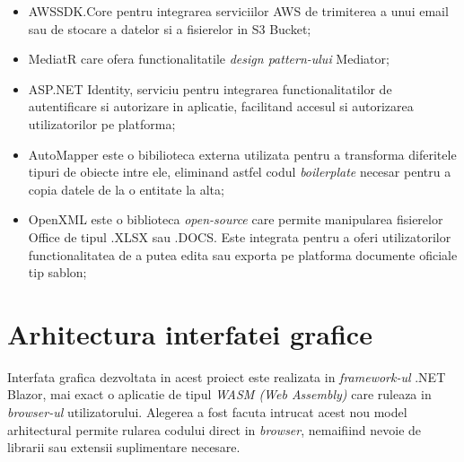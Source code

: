 \begin{itemize}
	\item  AWSSDK.Core pentru integrarea serviciilor AWS de trimiterea a unui email sau de stocare a datelor si a fisierelor in S3 Bucket;
	
	\item  MediatR care ofera functionalitatile \textit{design pattern-ului} Mediator;
	
	\item ASP.NET Identity, serviciu pentru integrarea functionalitatilor de autentificare si autorizare in aplicatie, facilitand accesul si autorizarea utilizatorilor pe platforma;
	
	
	\item AutoMapper este o bibilioteca externa utilizata pentru a transforma diferitele tipuri de obiecte intre ele, eliminand astfel codul \textit{boilerplate} necesar pentru a copia datele de la  o entitate la alta;
	
	\item OpenXML este o biblioteca \textit{open-source} care permite manipularea fisierelor Office de tipul .XLSX sau .DOCS. Este integrata pentru a oferi utilizatorilor functionalitatea de a putea edita sau exporta pe platforma documente oficiale tip sablon;
	
\end{itemize}
   

\section{Arhitectura interfatei grafice}
Interfata grafica dezvoltata in acest proiect este realizata in \textit{framework-ul} .NET Blazor, mai exact o aplicatie de tipul \textit{WASM (Web Assembly)} care ruleaza in \textit{browser-ul} utilizatorului. Alegerea a fost facuta intrucat acest nou model arhitectural permite rularea codului direct in \textit{browser}, nemaifiind nevoie de librarii sau extensii suplimentare necesare.\\

